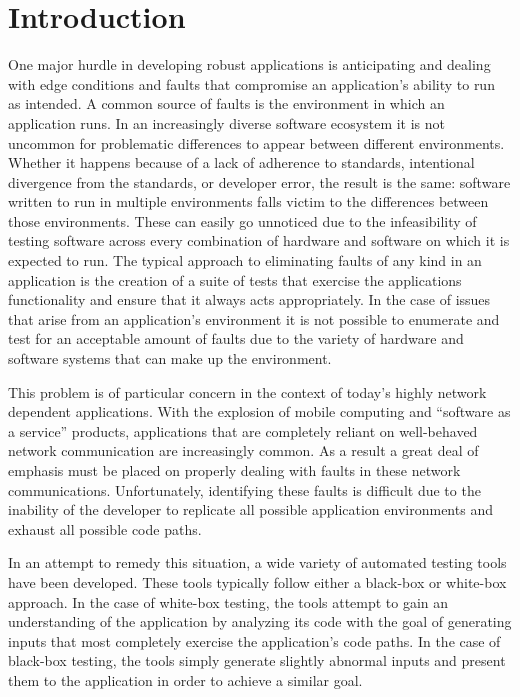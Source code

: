 \section{Introduction}

    One major hurdle in developing robust applications is anticipating and dealing with edge conditions and faults that
    compromise an application's ability to run as intended. A common source of faults is the environment in which an
    application runs. In an increasingly diverse software ecosystem it is not uncommon for problematic differences to
    appear between different environments. Whether it happens because of a lack of adherence to standards, intentional
    divergence from the standards, or developer error, the result is the same: software written to run in multiple
    environments falls victim to the differences between those environments. These can easily go unnoticed due to the
    infeasibility of testing software across every combination of hardware and software on which it is expected to run.
    The typical approach to eliminating faults of any kind in an application is the creation of a suite of tests that
    exercise the applications functionality and ensure that it always acts appropriately. In the case of issues that
    arise from an application's environment it is not possible to enumerate and test for an acceptable amount of faults
    due to the variety of hardware and software systems that can make up the environment.

    This problem is of particular concern in the context of today's highly network dependent applications. With the
    explosion of mobile computing and ``software as a service'' products, applications that are completely reliant on
    well-behaved network communication are increasingly common. As a result a great deal of emphasis must be placed on
    properly dealing with faults in these network communications. Unfortunately, identifying these faults is difficult
    due to the inability of the developer to replicate all possible application environments and exhaust all possible
    code paths.

    In an attempt to remedy this situation, a wide variety of automated testing tools have been developed. These tools
    typically follow either a black-box or white-box approach. In the case of white-box testing, the tools attempt to
    gain an understanding of the application by analyzing its code with the goal of generating inputs that most
    completely exercise the application's code paths. In the case of black-box testing, the tools simply generate
    slightly abnormal inputs and present them to the application in order to achieve a similar goal.


